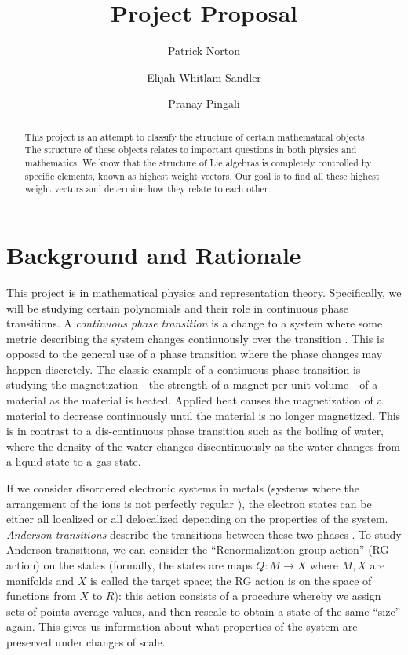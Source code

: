 \documentclass[11pt, reqno]{amsart}
\title{Project Proposal}
\author{Patrick Norton \and Elijah Whitlam-Sandler \and Pranay Pingali}
\begin{document}
\begin{abstract}
  This project is an attempt to classify the structure of certain mathematical
  objects. %
  The structure of these objects relates to important questions in both
  physics and mathematics. %
  We know that the structure of Lie algebras is completely controlled by
  specific elements, known as highest weight vectors. Our goal is to find all
  these highest weight vectors and determine how they relate to each other.
\end{abstract}

\maketitle

\section{Background and Rationale}




This project is in mathematical physics and representation theory. Specifically, we will be studying certain polynomials and their role in continuous phase transitions. A \emph{continuous phase transition} is a change to a system where some metric describing the system changes continuously over the transition \cite[\S1]{Sa06}. This is opposed to the general use of a phase transition where the phase changes may happen discretely. The classic example of a continuous phase transition is studying the magnetization---the strength of a magnet per unit volume---of a material as the material is heated. Applied heat causes the magnetization of a material to decrease continuously until the material is no longer magnetized. This is in contrast to a dis-continuous phase transition such as the boiling of water, where the density of the water changes discontinuously as the water changes from a liquid state to a gas state.

If we consider disordered electronic systems in metals (systems where the arrangement of the ions is not perfectly regular \cite{dicastro2006disordered}), the electron states can be either all localized or all delocalized depending on the properties of the system. \emph{Anderson transitions} describe the transitions between these two phases \cite{Evers_2008}. To study Anderson transitions, we can consider the ``Renormalization group action'' (RG action) on the states (formally, the states are maps $Q : M \to X$ where $M, X$ are manifolds and $X$ is called the target space; the RG action is on the space of functions from $X$ to $R$): this action consists of a procedure whereby we assign sets of points average values, and then rescale to obtain a state of the same ``size'' again. This gives us information about what properties of the system are preserved under changes of scale.
\end{document}
